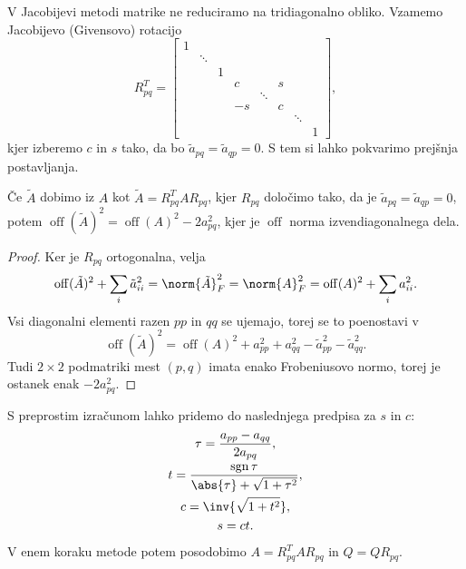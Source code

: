 V Jacobijevi metodi matrike ne reduciramo na tridiagonalno obliko.
Vzamemo Jacobijevo (Givensovo) rotacijo
\[
  R_{pq}^T =
  \begin{bmatrix}
	1 &        &   &    &        &   &        & \\
	  & \ddots &   &    &        &   &        & \\
	  &        & 1 &    &        &   &        & \\
	  &        &   & c  &        & s &        & \\
	  &        &   &    & \ddots &   &        & \\
	  &        &   & -s &        & c &        & \\
	  &        &   &    &        &   & \ddots & \\
	  &        &   &    &        &   &        & 1
  \end{bmatrix},
\]
kjer izberemo $c$ in $s$ tako, da bo $\tilde{a}_{pq} = \tilde{a}_{qp} = 0$.
S tem si lahko pokvarimo prejšnja postavljanja.

\begin{lema}
  Če $\tilde{A}$ dobimo iz $A$ kot $\tilde{A} = R_{pq}^T A R_{pq}$, kjer
  $R_{pq}$ določimo tako, da je $\tilde{a}_{pq} = \tilde{a}_{qp} = 0$, potem
  $\operatorname{off}(\tilde{A})^2 = \operatorname{off}(A)^2 - 2 a_{pq}^2$,
  kjer je $\operatorname{off}$ norma izvendiagonalnega dela.
\end{lema}

\begin{proof}
  Ker je $R_{pq}$ ortogonalna, velja
  \[
	\operatorname{off}(\tilde{A})^2 + \sum_i \tilde{a}_{ii}^2
	= \norm{\tilde{A}}_F^2
	= \norm{A}_F^2
	= \operatorname{off}(A)^2 + \sum_i a_{ii}^2.
  \]
  Vsi diagonalni elementi razen $pp$ in $qq$ se ujemajo, torej se to poenostavi
  v
  \[
	\operatorname{off}(\tilde{A})^2 = \operatorname{off}(A)^2 + a_{pp}^2 +
	a_{qq}^2 - \tilde{a}_{pp}^2 - \tilde{a}_{qq}^2.
  \]
  Tudi $2\times 2$ podmatriki mest $(p, q)$ imata enako Frobeniusovo normo,
  torej je ostanek enak $- 2 a_{pq}^2$.
\end{proof}


S preprostim izračunom lahko pridemo do naslednjega predpisa za $s$ in $c$:
\begin{gather*}
  \tau = \frac{a_{pp} - a_{qq}}{2 a_{pq}}, \\
  t = \frac{\operatorname{sgn} \tau}{\abs{\tau} + \sqrt{1 + \tau^2}}, \\
  c = \inv{\sqrt{1 + t^2}}, \\
  s = ct.
\end{gather*}
V enem koraku metode potem posodobimo $A = R_{pq}^T A R_{pq}$ in $Q = Q R_{pq}$.

